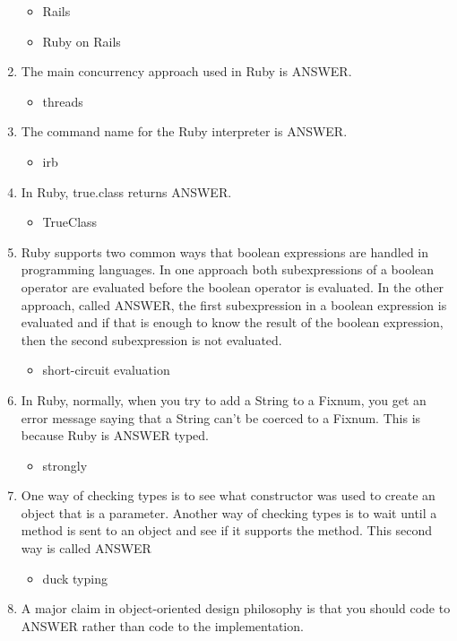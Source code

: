 \documentclass{exam}
\begin{document}
\begin{enumerate}
\begin{itemize}
\item Rails
\item Ruby on Rails
\end{itemize}
\item The main concurrency approach used in Ruby is ANSWER.
\begin{itemize}
\item threads
\end{itemize}
\item The command name for the Ruby interpreter is ANSWER.
\begin{itemize}
\item irb
\end{itemize}
\item In Ruby, true.class returns ANSWER.
\begin{itemize}
\item TrueClass
\end{itemize}
\item Ruby supports two common ways that boolean expressions are handled in programming languages.  In one approach both subexpressions of a boolean operator are evaluated before the boolean operator is evaluated.  In the other approach, called ANSWER, the first subexpression in a boolean expression is evaluated and if that is enough to know the result of the boolean expression, then the second subexpression is not evaluated.
\begin{itemize}
\item short-circuit evaluation
\end{itemize}
\item In Ruby, normally, when you try to add a String to a Fixnum, you get an error message saying that a String can't be coerced to a Fixnum.  This is because Ruby is ANSWER typed.
\begin{itemize}
\item strongly
\end{itemize}
\item One way of checking types is to see what constructor was used to create an object that is a parameter.  Another way of checking types is to wait until a method is sent to an object and see if it supports the method.  This second way is called ANSWER
\begin{itemize}
\item duck typing
\end{itemize}
\item A major claim in object-oriented design philosophy is that you should code to ANSWER rather than code to the implementation.

\end{enumerate}
\end{document}
